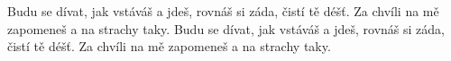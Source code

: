 \repeatingchorus{}
\beginchorus{}
\chordsoff{}
Budu se dívat, jak vstáváš a jdeš,
rovnáš si záda, čistí tě déšť.
Za chvíli na mě zapomeneš a na strachy taky.
Budu se dívat, jak vstáváš a jdeš,
rovnáš si záda, čistí tě déšť.
Za chvíli na mě zapomeneš a na strachy taky.
\chordson{}
\endchorus{}

\endsong{}

